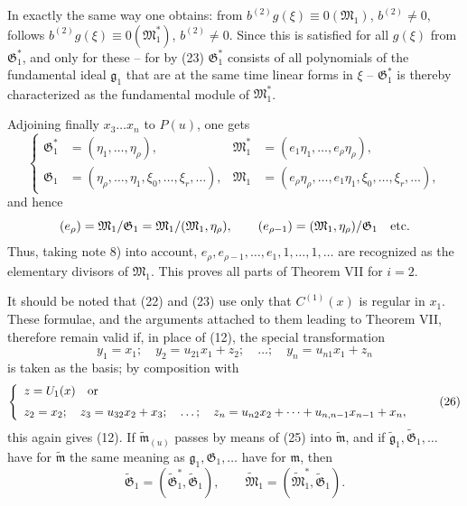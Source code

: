 \documentclass[11pt]{article}
\providecommand{\Gmod}{\mathfrak G}
\providecommand{\mideal}{\mathfrak m}
\providecommand{\gideal}{\mathfrak g}
\providecommand{\Gmod}{\mathfrak G}
\providecommand{\Mmod}{\mathfrak M}
\providecommand{\mideal}{\mathfrak m}
\providecommand{\gideal}{\mathfrak g}
\begin{document}
In exactly the same way one obtains: from $b^{(2)}g(\xi)\equiv0(\Mmod_1)$, $b^{(2)}\ne0$, follows $b^{(2)}g(\xi)\equiv0(\Mmod^*_1)$, $b^{(2)}\ne0$. Since this is satisfied for all $g(\xi)$ from $\Gmod^*_1$, and only for these -- for by (23) $\Gmod^*_1$ consists of all polynomials of the fundamental ideal $\gideal_1$ that are at the same time linear forms in $\xi$ -- $\Gmod^*_1$ is thereby characterized as the fundamental module of $\Mmod^*_1$.

Adjoining finally $x_3\ldots x_n$ to $P(u)$, one gets
\begin{equation}
\left\{\begin{aligned}
 \Gmod^*_1&=(\eta_1,\ldots,\eta_\rho),&
 \Mmod^*_1&=(e_1\eta_1,\ldots,e_\rho\eta_\rho),\\
 \Gmod_1&=(\eta_\rho,\ldots,\eta_1,\xi_0,\ldots,\xi_r,\ldots),&
 \Mmod_1&=(e_\rho\eta_\rho,\ldots,e_1\eta_1,\xi_0,\ldots,\xi_r,\ldots),
\end{aligned}\right.
\tag{24}
\end{equation}
and hence
\[
 (e_\rho)=\Mmod_1/\Gmod_1=\Mmod_1/(\Mmod_1,\eta_\rho),\qquad
 (e_{\rho-1})=(\Mmod_1,\eta_\rho)/\Gmod_1\quad\hbox{etc.}
\]
Thus, taking note 8) into account, $e_\rho,e_{\rho-1},\ldots,e_1,1,\ldots,1,\ldots$ are recognized as the elementary divisors of $\Mmod_1$. This proves all parts of Theorem VII for $i=2$.

It should be noted that (22) and (23) use only that $C^{(1)}(x)$ is regular in $x_1$. These formulae, and the arguments attached to them leading to Theorem VII, therefore remain valid if, in place of (12), the special transformation
\begin{equation}
 y_1=x_1;\quad y_2=u_{21}x_1+z_2;\quad\ldots;\quad y_n=u_{n1}x_1+z_n
\tag{25}
\end{equation}
is taken as the basis; by composition with
\begin{equation}
\left\{\begin{array}{l}
 z=U_1(x)\quad\hbox{or}\\[2mm]
 z_2=x_2;\quad z_3=u_{32}x_2+x_3;\quad\ldots;\quad z_n=u_{n2}x_2+\cdots+u_{n,n-1}x_{n-1}+x_n,
\end{array}\right.
\tag{26}
\end{equation}
this again gives (12). If $\widetilde{\mideal}_{(u)}$ passes by means of (25) into $\widetilde{\mideal}$, and if $\widetilde{\gideal}_1,\widetilde{\Gmod}_1,\ldots$ have for $\widetilde{\mideal}$ the same meaning as $\gideal_1,\Gmod_1,\ldots$ have for $\mideal$, then
\begin{equation}
 \widetilde{\Gmod}_1=(\widetilde{\Gmod}^{*}_1,\widetilde{\Gmod}_1),\qquad
 \widetilde{\Mmod}_1=(\widetilde{\Mmod}^{*}_1,\widetilde{\Gmod}_1).
\tag{27}
\end{equation}
\end{document}
